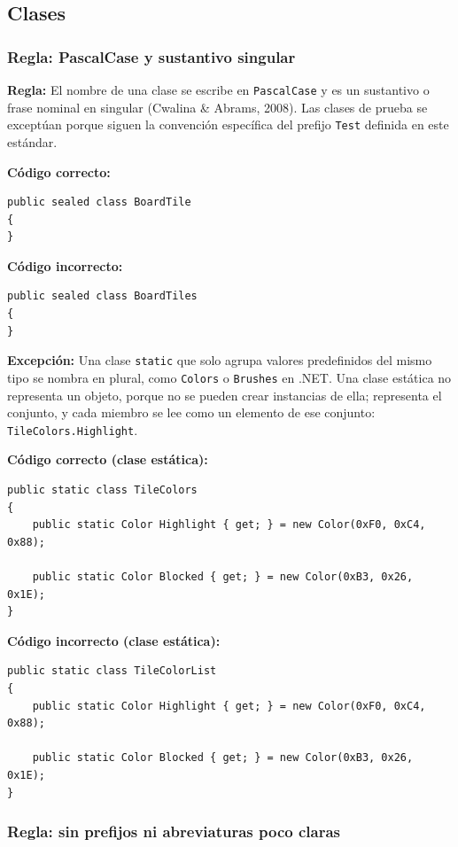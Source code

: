 \subsection{Clases}

\subsubsection{Regla: PascalCase y sustantivo singular}

\textbf{Regla:} El nombre de una clase se escribe en \texttt{PascalCase} y es un sustantivo o frase nominal en singular (Cwalina \& Abrams, 2008). Las clases de prueba se exceptúan porque siguen la convención específica del prefijo \texttt{Test} definida en este estándar.

\textbf{Código correcto:}
\begin{lstlisting}[style=csharpstyle]
public sealed class BoardTile
{
}
\end{lstlisting}

\textbf{Código incorrecto:}
\begin{lstlisting}[style=csharpstyle]
public sealed class BoardTiles
{
}
\end{lstlisting}

\textbf{Excepción:} Una clase \texttt{static} que solo agrupa valores predefinidos del mismo tipo se nombra en plural, como \texttt{Colors} o \texttt{Brushes} en .NET. Una clase estática no representa un objeto, porque no se pueden crear instancias de ella; representa el conjunto, y cada miembro se lee como un elemento de ese conjunto: \texttt{TileColors.Highlight}.

\textbf{Código correcto (clase estática):}
\begin{lstlisting}[style=csharpstyle]
public static class TileColors
{
    public static Color Highlight { get; } = new Color(0xF0, 0xC4, 0x88);

    public static Color Blocked { get; } = new Color(0xB3, 0x26, 0x1E);
}
\end{lstlisting}

\textbf{Código incorrecto (clase estática):}
\begin{lstlisting}[style=csharpstyle]
public static class TileColorList
{
    public static Color Highlight { get; } = new Color(0xF0, 0xC4, 0x88);

    public static Color Blocked { get; } = new Color(0xB3, 0x26, 0x1E);
}
\end{lstlisting}

\subsubsection{Regla: sin prefijos ni abreviaturas poco claras}

